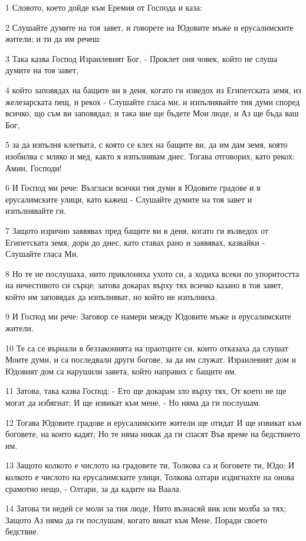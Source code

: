 \par 1 Словото, което дойде към Еремия от Господа и каза:
\par 2 Слушайте думите на тоя завет, и говорете на Юдовите мъже и ерусалимските жители; и ти да им речеш:
\par 3 Така казва Господ Израилевият Бог, - Проклет оня човек, който не слуша думите на тоя завет,
\par 4 който заповядах на бащите ви в деня, когато ги изведох из Египетската земя, из железарската пещ, и рекох - Слушайте гласа ми, и изпълнявайте тия думи според всичко, що съм ви заповядал; и така вие ще бъдете Мои люде, и Аз ще бъда ваш Бог,
\par 5 за да изпълня клетвата, с която се клех на бащите ви, да им дам земя, която изобилва с мляко и мед, както я изпълнявам днес. Тогава отговорих, като рекох: Амин, Господи!
\par 6 И Господ ми рече: Възгласи всички тия думи в Юдовите градове и в ерусалимските улици, като кажеш - Слушайте думите на тоя завет и изпълнявайте ги.
\par 7 Защото изрично заявявах пред бащите ви в деня, когато ги възведох от Египетската земя, дори до днес, като ставах рано и заявявах, казвайки - Слушайте гласа Ми.
\par 8 Но те не послушаха, нито приклониха ухото си, а ходиха всеки по упоритостта на нечестивото си сърце; затова докарах върху тях всичко казано в тоя завет, който им заповядах да изпълняват, но който не изпълниха.
\par 9 И Господ ми рече: Заговор се намери между Юдовите мъже и ерусалимските жители.
\par 10 Те са се върнали в беззаконията на праотците си, които отказаха да слушат Моите думи, и са последвали други богове, за да им служат. Израилевият дом и Юдовият дом са нарушили завета, който направих с бащите им.
\par 11 Затова, така казва Господ: - Ето ще докарам зло върху тях, От което не ще могат да избягнат; И ще извикат към мене, - Но няма да ги послушам.
\par 12 Тогава Юдовите градове и ерусалимските жители ще отидат И ще извикат към боговете, на които кадят; Но те няма никак да ги спасят Във време на бедствието им.
\par 13 Защото колкото е числото на градовете ти, Толкова са и боговете ти, Юдо; И колкото е числото на ерусалимските улици, Толкова олтари издигнахте на онова срамотно нещо, - Олтари, за да кадите на Ваала.
\par 14 Затова ти недей се моли за тия люде, Нито възнасяй вик или молба за тях; Защото Аз няма да ги послушам, когато викат към Мене, Поради своето бедствие.
